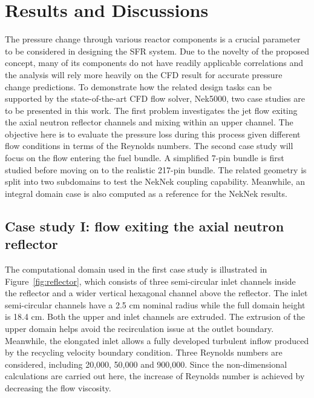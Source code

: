 \section{Results and Discussions}
\label{sec:discuss}
The pressure change through various reactor components is a crucial parameter to be considered in designing the SFR system.
Due to the novelty of the proposed concept, many of its components do not have readily applicable correlations and the analysis will rely more heavily on the CFD result for accurate pressure change predictions.
To demonstrate how the related design tasks can be supported by the state-of-the-art CFD flow solver, Nek5000, two case studies are to be presented in this work.
The first problem investigates the jet flow exiting the axial neutron reflector channels and mixing within an upper channel.
The objective here is to evaluate the pressure loss during this process given different flow conditions in terms of the Reynolds numbers.
The second case study will focus on the flow entering the fuel bundle.
A simplified 7-pin bundle is first studied before moving on to the realistic 217-pin bundle.
The related geometry is split into two subdomains to test the NekNek coupling capability.
Meanwhile, an integral domain case is also computed as a reference for the NekNek results.
 


\subsection{Case study I: flow exiting the axial neutron reflector}
\label{sec:results1}

The computational domain used in the first case study is illustrated in Figure~\ref{fig:reflector}, which consists of three semi-circular inlet channels inside the reflector and a wider vertical hexagonal channel above the reflector.
The inlet semi-circular channels have a 2.5 cm nominal radius while the full domain height is 18.4 cm.
Both the upper and inlet channels are extruded.
The extrusion of the upper domain helps avoid the recirculation issue at the outlet boundary.
Meanwhile, the elongated inlet allows a fully developed turbulent inflow produced by the recycling velocity boundary condition.
Three Reynolds numbers are considered, including 20,000, 50,000 and 900,000.
Since the non-dimensional calculations are carried out here, the increase of Reynolds number is achieved by decreasing the flow viscosity.


